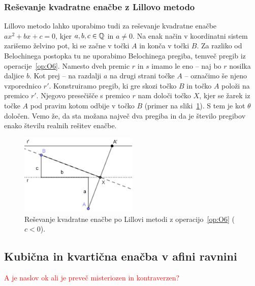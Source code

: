 
\subsubsection{Reševanje kvadratne enačbe z Lillovo metodo}
\label{podpodl:kvadr_en_lill}

Lillovo metodo lahko uporabimo tudi za reševanje kvadratne enačbe $a x^2 + b x + c = 0$, kjer $a, b, c \in \mathbb Q$ in $a \neq 0$. Na enak način v koordinatni sistem zarišemo želvino pot, ki se začne v točki $A$ in konča v točki $B$. Za razliko od Belochinega postopka tu ne uporabimo Belochinega pregiba, temveč pregib iz operacije~\ref{op:O6}. Namesto dveh premic $r$ in $s$ imamo le eno -- naj bo $r$ nosilka daljice $b$. Kot prej -- na razdalji $a$ na drugi strani točke $A$ -- označimo še njeno vzporednico $r'$. Konstruiramo pregib, ki gre skozi točko $B$ in točko $A$ položi na premico $r'$. Njegovo presečišče s premico $r$ nam določi točko $X$, kjer se žarek iz točke $A$ pod pravim kotom odbije v točko $B$ (primer na sliki~\ref{fig:kv_en_lill}). S tem je kot $\theta$ določen. Vemo že, da sta možana največ dva pregiba in da je število pregibov enako številu realnih rešitev enačbe.

\begin{figure}[h]
    \centering
    \includegraphics[width=0.5\textwidth]{images/kvadratna_enacba/kvadratna_enacba_lillova_metoda.png}
    \caption[Lillova metoda za kvadratno enačbo]{Reševanje kvadratne enačbe po Lillovi metodi z operacijo~\ref{op:O6} ($c < 0$).}
    \label{fig:kv_en_lill}
\end{figure}

\subsection{Kubična in kvartična enačba v afini ravnini}

\textcolor{red}{A je naslov ok ali je preveč misteriozen in kontraverzen?}

